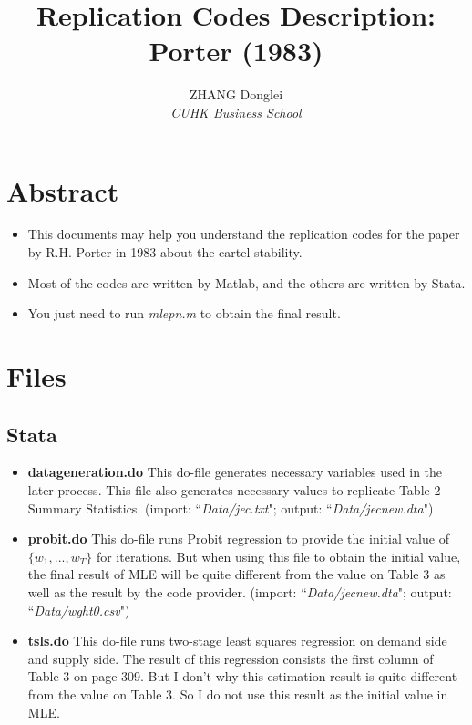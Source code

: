 \documentclass[12pt]{article}
\begin{document}
\title{\textbf{Replication Codes Description: Porter (1983)}}
\author{ZHANG Donglei \\ \textit{CUHK Business School}}
\maketitle 
\section{Abstract}
\begin{itemize}
\item This documents may help you understand the replication codes for the paper by R.H. Porter in 1983 about the cartel stability.
\item Most of the codes are written by Matlab, and the others are written by Stata.
\item You just need to run \textit{mlepn.m} to obtain the final result.
\end{itemize}

\section{Files}
\subsection{Stata}
\begin{itemize}
\item \textbf{datageneration.do} This do-file generates necessary variables used in the later process. This file also generates necessary values to replicate Table 2 Summary Statistics. (import: ``\textit{Data/jec.txt}"; output: ``\textit{Data/jecnew.dta}")

\item \textbf{probit.do} This do-file runs Probit regression to provide the initial value of $\{w_1,...,w_T\}$ for iterations. But when using this file to obtain the initial value, the final result of MLE will be quite different from the value on Table 3 as well as the result by the code provider. (import: ``\textit{Data/jecnew.dta}"; output: ``\textit{Data/wght0.csv}")

\item \textbf{tsls.do} This do-file runs two-stage least squares regression on demand side and supply side. The result of this regression consists the first column of Table 3 on page 309. But I don't why this estimation result is quite different from the value on Table 3. So I do not use this result as the initial value in MLE.
\end{itemize} 
\end{document}
